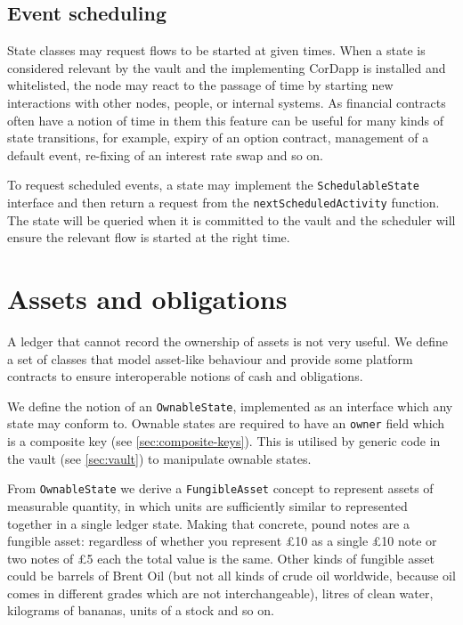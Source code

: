 \documentclass{article}
\begin{document}
\subsection{Event scheduling}\label{sec:event-scheduling}

State classes may request flows to be started at given times. When a state is considered relevant by the vault
and the implementing CorDapp is installed and whitelisted, the node may react to the passage of time by starting
new interactions with other nodes, people, or internal systems. As financial contracts often have a notion of
time in them this feature can be useful for many kinds of state transitions, for example, expiry of an option
contract, management of a default event, re-fixing of an interest rate swap and so on.

To request scheduled events, a state may implement the \texttt{SchedulableState} interface and then return a
request from the \texttt{nextScheduledActivity} function. The state will be queried when it is committed to the
vault and the scheduler will ensure the relevant flow is started at the right time.

\section{Assets and obligations}\label{sec:assets}

A ledger that cannot record the ownership of assets is not very useful. We define a set of classes that model
asset-like behaviour and provide some platform contracts to ensure interoperable notions of cash and obligations.

We define the notion of an \texttt{OwnableState}, implemented as an interface which any state may conform to. Ownable
states are required to have an \texttt{owner} field which is a composite key (see \cref{sec:composite-keys}). This is
utilised by generic code in the vault (see \cref{sec:vault}) to manipulate ownable states.


From \texttt{OwnableState} we derive a \texttt{FungibleAsset} concept to represent assets of measurable quantity, in
which units are sufficiently similar to represented together in a single ledger state. Making that concrete, pound notes
are a fungible asset: regardless of whether you represent \pounds10 as a single \pounds10 note or two notes of \pounds5
each the total value is the same. Other kinds of fungible asset could be barrels of Brent Oil (but not all kinds of
crude oil worldwide, because oil comes in different grades which are not interchangeable), litres of clean water,
kilograms of bananas, units of a stock and so on.
\end{document}
